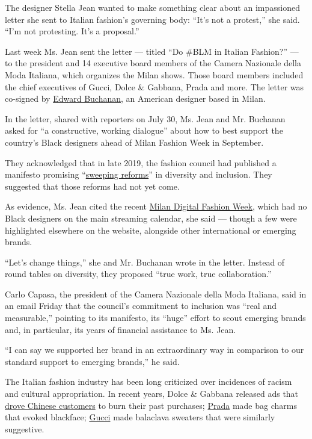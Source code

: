 The designer Stella Jean wanted to make something clear about an
impassioned letter she sent to Italian fashion's governing body: ``It's
not a protest,'' she said. ``I'm not protesting. It's a proposal.''

Last week Ms. Jean sent the letter --- titled ``Do \#BLM in Italian
Fashion?'' --- to the president and 14 executive board members of the
Camera Nazionale della Moda Italiana, which organizes the Milan shows.
Those board members included the chief executives of Gucci, Dolce \&
Gabbana, Prada and more. The letter was co-signed by
\href{https://www.nytimes.com/2019/02/21/fashion/milan-edward-buchanan-race.html}{Edward
Buchanan}, an American designer based in Milan.

In the letter, shared with reporters on July 30, Ms. Jean and Mr.
Buchanan asked for ``a constructive, working dialogue'' about how to
best support the country's Black designers ahead of Milan Fashion Week
in September.

They acknowledged that in late 2019, the fashion council had published a
manifesto promising
``\href{https://www.cameramoda.it/en/associazione/news/1588/}{sweeping
reforms}'' in diversity and inclusion. They suggested that those reforms
had not yet come.

As evidence, Ms. Jean cited the recent
\href{https://www.nytimes.com/2020/07/13/fashion/milan-digital-fashion-week-video-stream.html}{Milan
Digital Fashion Week}, which had no Black designers on the main
streaming calendar, she said --- though a few were highlighted elsewhere
on the website, alongside other international or emerging brands.

``Let's change things,'' she and Mr. Buchanan wrote in the letter.
Instead of round tables on diversity, they proposed ``true work, true
collaboration.''

Carlo Capasa, the president of the Camera Nazionale della Moda Italiana,
said in an email Friday that the council's commitment to inclusion was
``real and measurable,'' pointing to its manifesto, its ``huge'' effort
to scout emerging brands and, in particular, its years of financial
assistance to Ms. Jean.

``I can say we supported her brand in an extraordinary way in comparison
to our standard support to emerging brands,'' he said.

The Italian fashion industry has been long criticized over incidences of
racism and cultural appropriation. In recent years, Dolce \& Gabbana
released ads that
\href{https://www.nytimes.com/2018/11/23/fashion/dolce-gabbana-china-disaster-backlash.html}{drove
Chinese customers} to burn their past purchases;
\href{https://www.nytimes.com/2020/02/04/style/Prada-racism-City-Commission-on-Human-Rights.html}{Prada}
made bag charms that evoked blackface;
\href{https://www.nytimes.com/2019/02/07/business/gucci-blackface-adidas-apologize.html}{Gucci}
made balaclava sweaters that were similarly suggestive.

